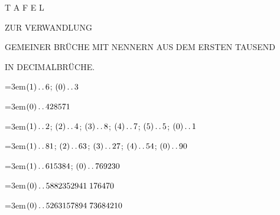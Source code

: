 \clearpage{}\thispagestyle{empty}
\renewcommand{\BookRunningTitle}{Verwandlung gemeiner Brüche in Decimalbrüche}
\begin{center}
\vspace*{1.0in}
{\LARGE T A F E L}\par\bigskip
{\large ZUR VERWANDLUNG}\par\bigskip
{\Large GEMEINER BRÜCHE MIT NENNERN AUS DEM ERSTEN TAUSEND}\par\bigskip
{\large IN DECIMALBRÜCHE.}
\end{center}

\clearpage{}%
\begingroup\raggedright
\par\noindent\hangindent=3em\enspace $(1)\mathinner{.\,.}6$; $(0)\mathinner{.\,.}3$\par\smallskip

\par\noindent\hangindent=3em\enspace $(0)\mathinner{.\,.}428571$\par\smallskip

\par\noindent\hangindent=3em\enspace $(1)\mathinner{.\,.}2$; $(2)\mathinner{.\,.}4$; $(3)\mathinner{.\,.}8$; $(4)\mathinner{.\,.}7$; $(5)\mathinner{.\,.}5$; $(0)\mathinner{.\,.}1$\par\smallskip

\par\noindent\hangindent=3em\enspace $(1)\mathinner{.\,.}81$; $(2)\mathinner{.\,.}63$; $(3)\mathinner{.\,.}27$; $(4)\mathinner{.\,.}54$; $(0)\mathinner{.\,.}90$\par\smallskip

\par\noindent\hangindent=3em\enspace $(1)\mathinner{.\,.}615384$; $(0)\mathinner{.\,.}769230$\par\smallskip

\par\noindent\hangindent=3em\enspace $(0)\mathinner{.\,.}5882352941\;\allowbreak 176470$\par\smallskip

\par\noindent\hangindent=3em\enspace $(0)\mathinner{.\,.}5263157894\;\allowbreak 73684210$\par\smallskip

